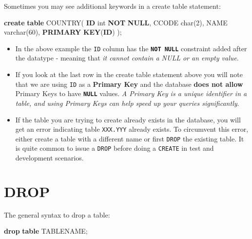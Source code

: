 \documentclass[
]{book}
\newenvironment{Shaded}{\begin{snugshade}}{\end{snugshade}}
\newcommand{\DataTypeTok}[1]{\textcolor[rgb]{0.13,0.29,0.53}{#1}}
\newcommand{\DecValTok}[1]{\textcolor[rgb]{0.00,0.00,0.81}{#1}}
\newcommand{\KeywordTok}[1]{\textcolor[rgb]{0.13,0.29,0.53}{\textbf{#1}}}
\newcommand{\NormalTok}[1]{#1}
\begin{document}
Sometimes you may see additional keywords in a create table statement:

\begin{Shaded}
\begin{Highlighting}[]
\KeywordTok{create} \KeywordTok{table}\NormalTok{ COUNTRY(}
    \KeywordTok{ID} \DataTypeTok{int} \KeywordTok{NOT} \KeywordTok{NULL}\NormalTok{,}
\NormalTok{    CCODE }\DataTypeTok{char}\NormalTok{(}\DecValTok{2}\NormalTok{),}
\NormalTok{    NAME }\DataTypeTok{varchar}\NormalTok{(}\DecValTok{60}\NormalTok{),}
    \KeywordTok{PRIMARY} \KeywordTok{KEY}\NormalTok{(}\KeywordTok{ID}\NormalTok{)}
\NormalTok{);}
\end{Highlighting}
\end{Shaded}

\begin{itemize}
\item
  In the above example the \texttt{ID} column has the {\textbf{\texttt{NOT\ NULL}}} constraint added after the datatype - meaning that \emph{it cannot contain a NULL or an empty value}.
\item
  If you look at the last row in the create table statement above you will note that we are using \texttt{ID} as a {\textbf{Primary Key}} and the database \textbf{does not allow} Primary Keys to have \textbf{\texttt{NULL}} values. \emph{A Primary Key is a unique identifier in a table, and using Primary Keys can help speed up your queries significantly}.
\item
  If the table you are trying to create already exists in the database, you will get an error indicating table \texttt{XXX.YYY} already exists. To circumvent this error, either create a table with a different name or first \texttt{DROP} the existing table. It is quite common to issue a \texttt{DROP} before doing a \texttt{CREATE} in test and development scenarios.
\end{itemize}

\hypertarget{drop}{%
\section{DROP}\label{drop}}

The general syntax to drop a table:

\begin{Shaded}
\begin{Highlighting}[]
\KeywordTok{drop} \KeywordTok{table}\NormalTok{ TABLENAME;}
\end{Highlighting}
\end{Shaded}
\end{document}
